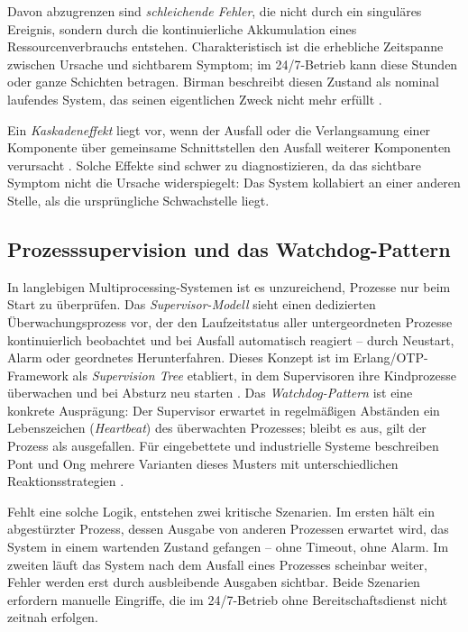 Davon abzugrenzen sind \textit{schleichende Fehler}, die nicht durch ein singuläres
Ereignis, sondern durch die kontinuierliche Akkumulation eines Ressourcenverbrauchs
entstehen. Charakteristisch ist die erhebliche Zeitspanne zwischen Ursache und sichtbarem
Symptom; im 24/7-Betrieb kann diese Stunden oder ganze Schichten betragen. Birman
beschreibt diesen Zustand als nominal laufendes System, das seinen eigentlichen Zweck
nicht mehr erfüllt \cite{birman2012}.

Ein \textit{Kaskadeneffekt} liegt vor, wenn der Ausfall oder die Verlangsamung einer
Komponente über gemeinsame Schnittstellen den Ausfall weiterer Komponenten verursacht
\cite{ieee_cascade2016}. Solche Effekte sind schwer zu diagnostizieren, da das sichtbare
Symptom nicht die Ursache widerspiegelt: Das System kollabiert an einer anderen Stelle,
als die ursprüngliche Schwachstelle liegt.

\subsection{Prozesssupervision und das Watchdog-Pattern}
\label{sec:grundlagen-supervision}

In langlebigen Multiprocessing-Systemen ist es unzureichend, Prozesse nur beim Start zu
überprüfen. Das \textit{Supervisor-Modell} sieht einen dedizierten Überwachungsprozess
vor, der den Laufzeitstatus aller untergeordneten Prozesse kontinuierlich beobachtet und
bei Ausfall automatisch reagiert -- durch Neustart, Alarm oder geordnetes Herunterfahren.
Dieses Konzept ist im Erlang/OTP-Framework als \textit{Supervision Tree} etabliert, in
dem Supervisoren ihre Kindprozesse überwachen und bei Absturz neu starten
\cite{armstrong2007}. Das \textit{Watchdog-Pattern} ist eine konkrete Ausprägung: Der
Supervisor erwartet in regelmäßigen Abständen ein Lebenszeichen (\textit{Heartbeat}) des
überwachten Prozesses; bleibt es aus, gilt der Prozess als ausgefallen. Für eingebettete
und industrielle Systeme beschreiben Pont und Ong mehrere Varianten dieses Musters mit
unterschiedlichen Reaktionsstrategien \cite{pont_watchdog}.

Fehlt eine solche Logik, entstehen zwei kritische Szenarien. Im ersten hält ein
abgestürzter Prozess, dessen Ausgabe von anderen Prozessen erwartet wird, das System in
einem wartenden Zustand gefangen -- ohne Timeout, ohne Alarm. Im zweiten läuft das System
nach dem Ausfall eines Prozesses scheinbar weiter, Fehler werden erst durch ausbleibende
Ausgaben sichtbar. Beide Szenarien erfordern manuelle Eingriffe, die im 24/7-Betrieb ohne
Bereitschaftsdienst nicht zeitnah erfolgen.


